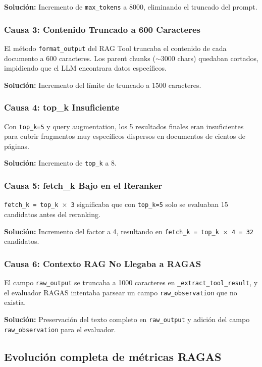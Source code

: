 \textbf{Solución:} Incremento de \texttt{max\_tokens} a 8000, eliminando el truncado del prompt.

\subsubsection{Causa 3: Contenido Truncado a 600 Caracteres}

El método \texttt{format\_output} del \ac{RAG} Tool truncaba el contenido de cada documento a 600 caracteres. Los parent chunks ($\sim$3000 chars) quedaban cortados, impidiendo que el \ac{LLM} encontrara datos específicos.

\textbf{Solución:} Incremento del límite de truncado a 1500 caracteres.

\subsubsection{Causa 4: top\_k Insuficiente}

Con \texttt{top\_k=5} y query augmentation, los 5 resultados finales eran insuficientes para cubrir fragmentos muy específicos dispersos en documentos de cientos de páginas.

\textbf{Solución:} Incremento de \texttt{top\_k} a 8.

\subsubsection{Causa 5: fetch\_k Bajo en el Reranker}

\texttt{fetch\_k = top\_k $\times$ 3} significaba que con \texttt{top\_k=5} solo se evaluaban 15 candidatos antes del reranking.

\textbf{Solución:} Incremento del factor a 4, resultando en \texttt{fetch\_k = top\_k $\times$ 4 = 32} candidatos.

\subsubsection{Causa 6: Contexto \ac{RAG} No Llegaba a RAGAS}

El campo \texttt{raw\_output} se truncaba a 1000 caracteres en \texttt{\_extract\_tool\_result}, y el evaluador \ac{RAGAS} intentaba parsear un campo \texttt{raw\_observation} que no existía.

\textbf{Solución:} Preservación del texto completo en \texttt{raw\_output} y adición del campo \texttt{raw\_observation} para el evaluador.

\subsection{Evolución completa de métricas RAGAS}

